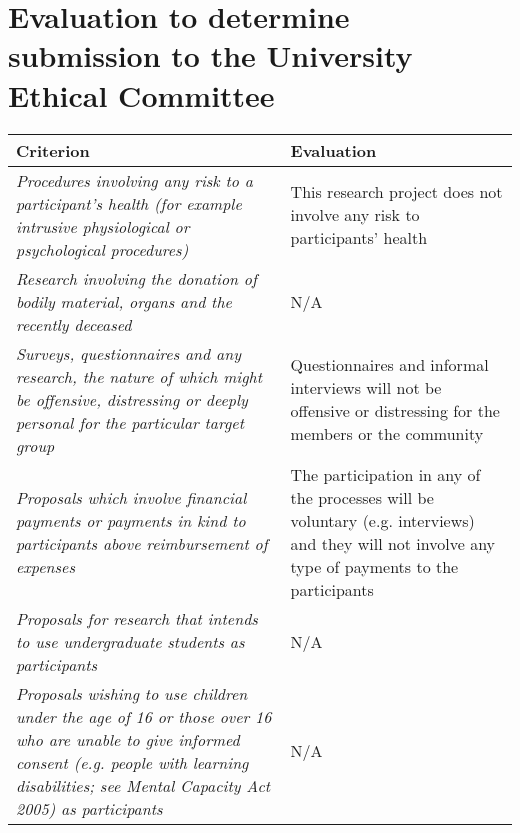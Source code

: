 \chapter{Evaluation to determine submission to the University Ethical Committee}
\label{unis_ethics}

\begin{longtable}{|p{10cm}|p{4cm}|}
\hline
Criterion                                                                                                                                                                                                                     & Evaluation \\ \hline \hline
\textsl{Procedures involving any risk to a participant’s health (for example intrusive physiological or psychological procedures)}                                                                                           & This research project does not involve any risk to participants' health     \\ \hline
\textsl{Research involving the donation of bodily material, organs and the recently deceased}                                                                                                                               & N/A        \\ \hline
\textsl{Surveys, questionnaires and any research, the nature of which might be offensive, distressing or deeply personal for the particular target group}                                                                   & Questionnaires and informal interviews will not be offensive or distressing for the members or the community        \\ \hline
\textsl{Proposals which involve financial payments or payments in kind to participants above reimbursement of expenses}                                                                                                     & The participation in any of the processes will be voluntary (e.g. interviews) and they will not involve any type of payments to the participants \\ \hline
\textsl{Proposals for research that intends to use undergraduate students as participants}                                                                                                                                  & N/A        \\ \hline
\textsl{Proposals wishing to use children under the age of 16 or those over 16 who are unable to give informed consent (e.g. people with learning disabilities; see Mental Capacity Act 2005) as participants}              & N/A        \\ \hline

\end{longtable}
